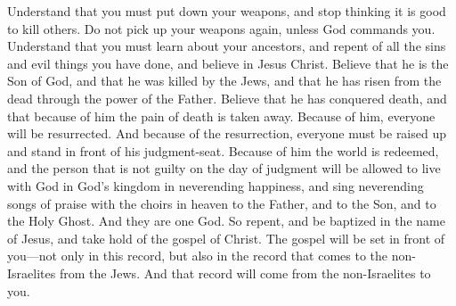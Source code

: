 \bverse \iffalse Know ye that ye must lay down your weapons of war, and delight no more in the shedding of blood, and take them not again, save it be that God shall command you. \fi
Understand that you must put down your weapons, and stop thinking it is good to kill others. Do not pick up your weapons again, unless God commands you.
\bverse \iffalse Know ye that ye must come to the knowledge of your fathers, and repent of all your sins and iniquities, and believe in Jesus Christ, that he is the Son of God, and that he was slain by the Jews, and by the power of the Father he hath risen again, whereby he hath gained the victory over the grave; and also in him is the sting of death swallowed up. \fi
Understand that you must learn about your ancestors, and repent of all the sins and evil things you have done, and believe in Jesus Christ. Believe that he is the Son of God, and that he was killed by the Jews, and that he has risen from the dead through the power of the Father. Believe that he has conquered death, and that because of him the pain of death is taken away.
\bverse \iffalse And he bringeth to pass the resurrection of the dead, whereby man must be raised to stand before his judgment-seat. \fi
Because of him, everyone will be resurrected. And because of the resurrection, everyone must be raised up and stand in front of his judgment-seat.
\bverse \iffalse And he hath brought to pass the redemption of the world, whereby he that is found guiltless before him at the judgment day hath it given unto him to dwell in the presence of God in his kingdom, to sing ceaseless praises with the choirs above, unto the Father, and unto the Son, and unto the Holy Ghost, which are one God, in a state of happiness which hath no end. \fi
Because of him the world is redeemed, and the person that is not guilty on the day of judgment will be allowed to live with God in God's kingdom in neverending happiness, and sing neverending songs of praise with the choirs in heaven to the Father, and to the Son, and to the Holy Ghost. And they are one God.
\bverse \iffalse Therefore repent, and be baptized in the name of Jesus, and lay hold upon the gospel of Christ, which shall be set before you, not only in this record but also in the record which shall come unto the Gentiles from the Jews, which record shall come from the Gentiles unto you. \fi
So repent, and be baptized in the name of Jesus, and take hold of the gospel of Christ. The gospel will be set in front of you---not only in this record, but also in the record that comes to the non-Israelites from the Jews. And that record will come from the non-Israelites to you.
